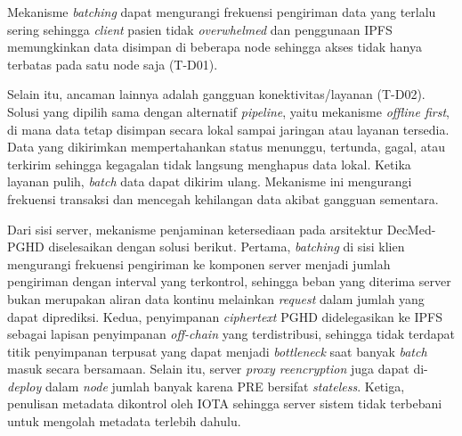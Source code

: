 Mekanisme \textit{batching} dapat mengurangi frekuensi pengiriman data yang terlalu sering sehingga \textit{client} pasien tidak \textit{overwhelmed} dan penggunaan IPFS memungkinkan data disimpan di beberapa node sehingga akses tidak hanya terbatas pada satu node saja (T-D01).

Selain itu, ancaman lainnya adalah gangguan konektivitas/layanan (T-D02).
Solusi yang dipilih sama dengan alternatif \textit{pipeline}, yaitu mekanisme \textit{offline first}, di mana data tetap disimpan secara lokal sampai jaringan atau layanan tersedia.
Data yang dikirimkan mempertahankan status menunggu, tertunda, gagal, atau terkirim sehingga kegagalan tidak langsung menghapus data lokal. 
Ketika layanan pulih, \textit{batch} data dapat dikirim ulang. 
Mekanisme ini mengurangi frekuensi transaksi dan mencegah kehilangan data akibat gangguan sementara.

Dari sisi server, mekanisme penjaminan ketersediaan pada arsitektur DecMed-PGHD diselesaikan dengan solusi berikut. 
Pertama, \textit{batching} di sisi klien mengurangi frekuensi pengiriman ke komponen server menjadi jumlah pengiriman dengan interval yang terkontrol, sehingga beban yang diterima server bukan merupakan aliran data kontinu melainkan \textit{request} dalam jumlah yang dapat diprediksi. 
Kedua, penyimpanan \textit{ciphertext} PGHD didelegasikan ke IPFS sebagai lapisan penyimpanan \textit{off-chain} yang terdistribusi, sehingga tidak terdapat titik penyimpanan terpusat yang dapat menjadi \textit{bottleneck} saat banyak \textit{batch} masuk secara bersamaan. 
Selain itu, server \textit{proxy reencryption} juga dapat di-\textit{deploy} dalam \textit{node} jumlah banyak karena PRE bersifat \textit{stateless}.
Ketiga, penulisan metadata dikontrol oleh IOTA sehingga server sistem tidak terbebani untuk mengolah metadata terlebih dahulu.




